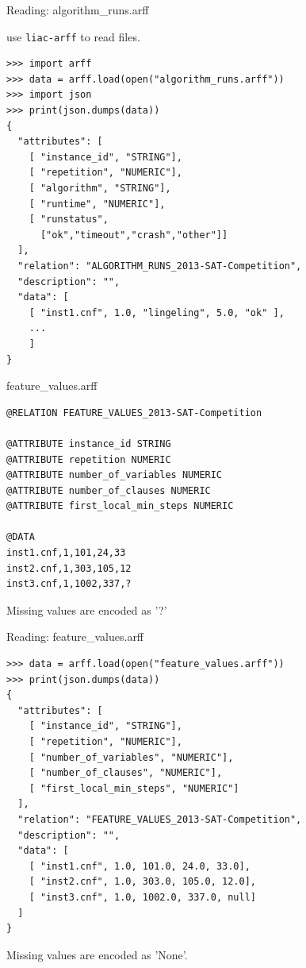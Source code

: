 \documentclass[t]{beamer}
\begin{document}
\begin{frame}[c,fragile]{Reading: algorithm\_runs.arff}

\scriptsize

use \texttt{liac-arff} to read files.

\begin{verbatim}
>>> import arff
>>> data = arff.load(open("algorithm_runs.arff"))
>>> import json
>>> print(json.dumps(data))
{
  "attributes": [
    [ "instance_id", "STRING"], 
    [ "repetition", "NUMERIC"], 
    [ "algorithm", "STRING"], 
    [ "runtime", "NUMERIC"], 
    [ "runstatus", 
      ["ok","timeout","crash","other"]]
  ], 
  "relation": "ALGORITHM_RUNS_2013-SAT-Competition", 
  "description": "", 
  "data": [
    [ "inst1.cnf", 1.0, "lingeling", 5.0, "ok" ], 
    ...
    ]
}
\end{verbatim}

\end{frame}
\begin{frame}[c,fragile]{feature\_values.arff}

\small
\begin{verbatim}
@RELATION FEATURE_VALUES_2013-SAT-Competition

@ATTRIBUTE instance_id STRING
@ATTRIBUTE repetition NUMERIC
@ATTRIBUTE number_of_variables NUMERIC
@ATTRIBUTE number_of_clauses NUMERIC
@ATTRIBUTE first_local_min_steps NUMERIC

@DATA
inst1.cnf,1,101,24,33
inst2.cnf,1,303,105,12
inst3.cnf,1,1002,337,?
\end{verbatim}

Missing values are encoded as '?'

\end{frame}
\begin{frame}[c,fragile]{Reading: feature\_values.arff}

\scriptsize
\begin{verbatim}
>>> data = arff.load(open("feature_values.arff"))
>>> print(json.dumps(data))
{
  "attributes": [
    [ "instance_id", "STRING"], 
    [ "repetition", "NUMERIC"], 
    [ "number_of_variables", "NUMERIC"], 
    [ "number_of_clauses", "NUMERIC"], 
    [ "first_local_min_steps", "NUMERIC"]
  ], 
  "relation": "FEATURE_VALUES_2013-SAT-Competition", 
  "description": "", 
  "data": [
    [ "inst1.cnf", 1.0, 101.0, 24.0, 33.0], 
    [ "inst2.cnf", 1.0, 303.0, 105.0, 12.0], 
    [ "inst3.cnf", 1.0, 1002.0, 337.0, null]
  ]
}

\end{verbatim}

Missing values are encoded as 'None'.

\end{frame}
\end{document}
